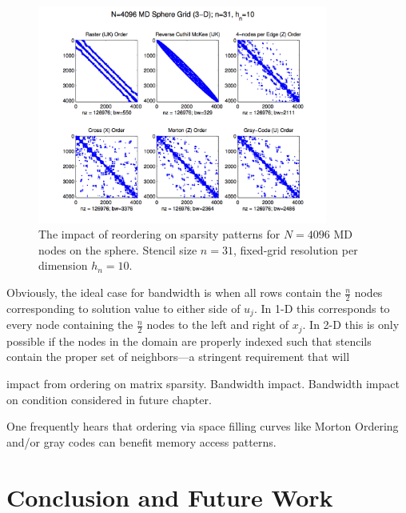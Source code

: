 \documentclass{report}
\begin{document}
\begin{figure}
\centering
\includegraphics[width=0.85\textwidth]{rbffd_methods_content/hashing/dm_node_orderings_md4096_n31_hn10.png} 
\caption{ The impact of reordering on sparsity patterns for $N=4096$ MD nodes on the sphere. Stencil size $n=31$, fixed-grid resolution per dimension $h_n=10$. }
\label{fig:orderings}
\end{figure}




Obviously, the ideal case for bandwidth is when all rows contain the $\frac{n}{2}$ nodes corresponding to solution value to either side of $u_j$. In 1-D this corresponds to every node containing the $\frac{n}{2}$ nodes to the left and right of $x_j$. In 2-D this is only possible if the nodes in the domain are properly indexed such that stencils contain the proper set of neighbors---a stringent requirement that will 

impact from ordering on matrix sparsity. Bandwidth impact. Bandwidth impact on condition considered in future chapter. 

One frequently hears that ordering via space filling curves like Morton Ordering and/or gray codes can benefit memory access patterns. 


\section{Conclusion and Future Work}
\end{document}
